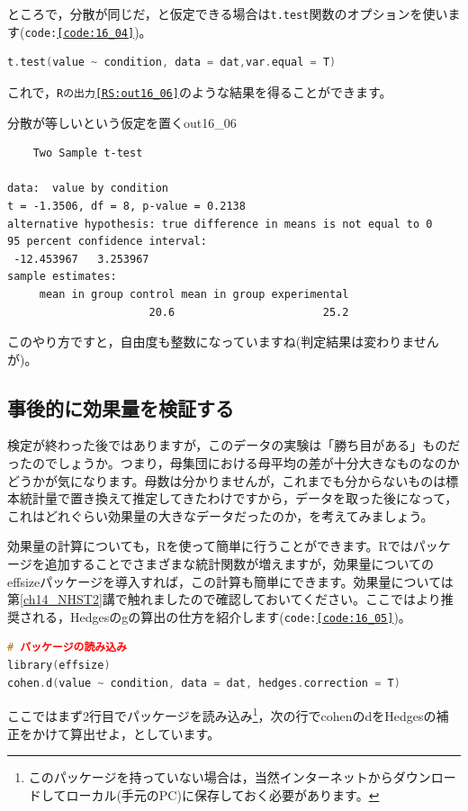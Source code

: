 \documentclass{ltjsbook}
\begin{document}
ところで，分散が同じだ，と仮定できる場合は\texttt{t.test}関数のオプションを使います(\texttt{code:\ref{code:16_04}})。

\begin{lstlisting}[language=c++,label={code:16_04},caption={分散のオプション指定}]
t.test(value ~ condition, data = dat,var.equal = T)
\end{lstlisting}

これで，\texttt{Rの出力\ref{RS:out16_06}}のような結果を得ることができます。

\begin{Rscreen}{分散が等しいという仮定を置く}{out16_06}
	\begin{verbatim}
	Two Sample t-test

data:  value by condition
t = -1.3506, df = 8, p-value = 0.2138
alternative hypothesis: true difference in means is not equal to 0
95 percent confidence interval:
 -12.453967   3.253967
sample estimates:
     mean in group control mean in group experimental 
                      20.6                       25.2 
\end{verbatim}
\end{Rscreen}
このやり方ですと，自由度も整数になっていますね(判定結果は変わりませんが)。

\subsection{事後的に効果量を検証する}
検定が終わった後ではありますが，このデータの実験は「勝ち目がある」ものだったのでしょうか。つまり，母集団における母平均の差が十分大きなものなのかどうかが気になります。母数は分かりませんが，これまでも分からないものは標本統計量で置き換えて推定してきたわけですから，データを取った後になって，これはどれぐらい効果量の大きなデータだったのか，を考えてみましょう。

効果量の計算についても，Rを使って簡単に行うことができます。Rではパッケージを追加することでさまざまな統計関数が増えますが，効果量についての\textsf{effsize}パッケージ\parencite{effsize}を導入すれば，この計算も簡単にできます。効果量については第\ref{ch14_NHST2}講で触れましたので確認しておいてください。ここではより推奨される，Hedgesのgの算出の仕方を紹介します(\texttt{code:\ref{code:16_05}})。

\begin{lstlisting}[language=c++,label={code:16_05},caption={効果量を求める}]
# パッケージの読み込み
library(effsize)
cohen.d(value ~ condition, data = dat, hedges.correction = T)
\end{lstlisting}
ここではまず2行目でパッケージを読み込み\footnote{このパッケージを持っていない場合は，当然インターネットからダウンロードしてローカル(手元のPC)に保存しておく必要があります。}，次の行でcohenのdをHedgesの補正をかけて算出せよ，としています。
\end{document}
